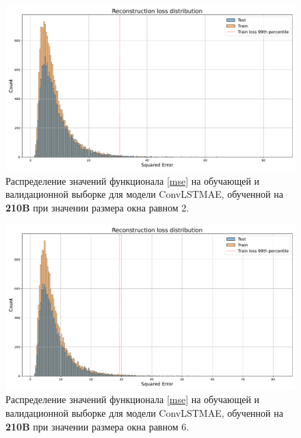 \documentclass{article}
\begin{document}
    \begin{figure}[]
        \centering
            \includegraphics[scale=.3]{model_2_loss_distr.pdf}
            \caption{Распределение значений функционала \eqref{mse} на обучающей и валидационной выборке для модели ConvLSTMAE, обученной на \textbf{210B} при значении размера окна равном 2.}\label{model_2_loss_distr}
        \centering
    \end{figure}
    
    \begin{figure}[]
        \centering
            \includegraphics[scale=.3]{model_6_loss_distr.pdf}
            \caption{Распределение значений функционала \eqref{mse} на обучающей и валидационной выборке для модели ConvLSTMAE, обученной на \textbf{210B} при значении размера окна равном 6.}\label{model_6_loss_distr}
        \end{figure}







\newpage
\appendix
{}
\renewcommand{\thesubsection}{\Alph{subsection}}
\end{document}
